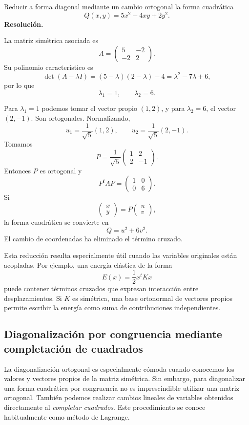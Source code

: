 \begin{solvedexercise}
Reducir a forma diagonal mediante un cambio ortogonal la forma cuadrática
\[
Q(x,y)=5x^2-4xy+2y^2.
\]
\tcblower
\textbf{Resolución.}\par\smallskip
La matriz simétrica asociada es
\[
A=\begin{pmatrix}
5&-2\\
-2&2
\end{pmatrix}.
\]
Su polinomio característico es
\[
\det(A-\lambda I)
=(5-\lambda)(2-\lambda)-4
=\lambda^2-7\lambda+6,
\]
por lo que
\[
\lambda_1=1,
\qquad
\lambda_2=6.
\]

Para $\lambda_1=1$ podemos tomar el vector propio $(1,2)$, y para $\lambda_2=6$, el vector $(2,-1)$. Son ortogonales. Normalizando,
\[
u_1=\frac1{\sqrt5}(1,2),
\qquad
u_2=\frac1{\sqrt5}(2,-1).
\]
Tomamos
\[
P=\frac1{\sqrt5}
\begin{pmatrix}
1&2\\
2&-1
\end{pmatrix}.
\]
Entonces $P$ es ortogonal y
\[
P^tAP=
\begin{pmatrix}
1&0\\
0&6
\end{pmatrix}.
\]
Si
\[
\begin{pmatrix}x\\y\end{pmatrix}
=P\begin{pmatrix}u\\v\end{pmatrix},
\]
la forma cuadrática se convierte en
\[
\boxed{Q=u^2+6v^2.}
\]
El cambio de coordenadas ha eliminado el término cruzado.
\end{solvedexercise}

Esta reducción resulta especialmente útil cuando las variables originales están acopladas. Por ejemplo, una energía elástica de la forma
\[
E(x)=\frac12x^tKx
\]
puede contener términos cruzados que expresan interacción entre desplazamientos. Si $K$ es simétrica, una base ortonormal de vectores propios permite escribir la energía como suma de contribuciones independientes.


\subsection{Diagonalización por congruencia mediante completación de cuadrados}

La diagonalización ortogonal es especialmente cómoda cuando conocemos los valores y vectores propios de la matriz simétrica. Sin embargo, para diagonalizar una forma cuadrática por congruencia no es imprescindible utilizar una matriz ortogonal. También podemos realizar cambios lineales de variables obtenidos directamente al \emph{completar cuadrados}. Este procedimiento se conoce habitualmente como método de Lagrange.

